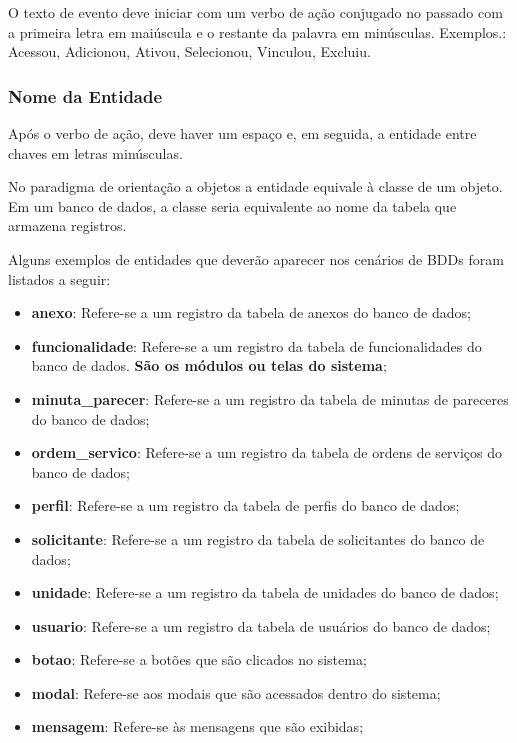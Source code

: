 O texto de evento deve iniciar com um verbo de ação conjugado no passado com a primeira letra em maiúscula e o restante da palavra em minúsculas. Exemplos.:  Acessou, Adicionou, Ativou, Selecionou, Vinculou, Excluiu.

\subsubsection{Nome da Entidade}
	Após o verbo de ação, deve haver um espaço e, em seguida, a entidade entre chaves em letras minúsculas. 
	
	No paradigma de orientação a objetos a entidade equivale à classe de um objeto. Em um banco de dados, a classe seria equivalente ao nome da tabela que armazena registros.      

	Alguns exemplos de entidades que deverão aparecer nos cenários de BDDs foram listados a seguir:
	
	\begin{itemize}
		\item \textbf{anexo}: Refere-se a um registro da tabela de anexos do banco de dados;

		\item \textbf{funcionalidade}: Refere-se a um registro da tabela de funcionalidades do banco de dados. \textbf{São os módulos ou telas do sistema};

		\item \textbf{minuta\_parecer}: Refere-se a um registro da tabela de minutas de pareceres do banco de dados;

		\item \textbf{ordem\_servico}: Refere-se a um registro da tabela de ordens de serviços do banco de dados;

		\item \textbf{perfil}: Refere-se a um registro da tabela de perfis do banco de dados;

		\item \textbf{solicitante}: Refere-se a um registro da tabela de solicitantes do banco de dados;

		\item \textbf{unidade}: Refere-se a um registro da tabela de unidades do banco de dados;

		\item \textbf{usuario}: Refere-se a um registro da tabela de usuários do banco de dados;

		\item \textbf{botao}: Refere-se a botões que são clicados no sistema;
		 		
		\item \textbf{modal}: Refere-se aos modais que são acessados dentro do sistema;
		
		\item \textbf{mensagem}: Refere-se às mensagens que são exibidas;
		
	\end{itemize}



